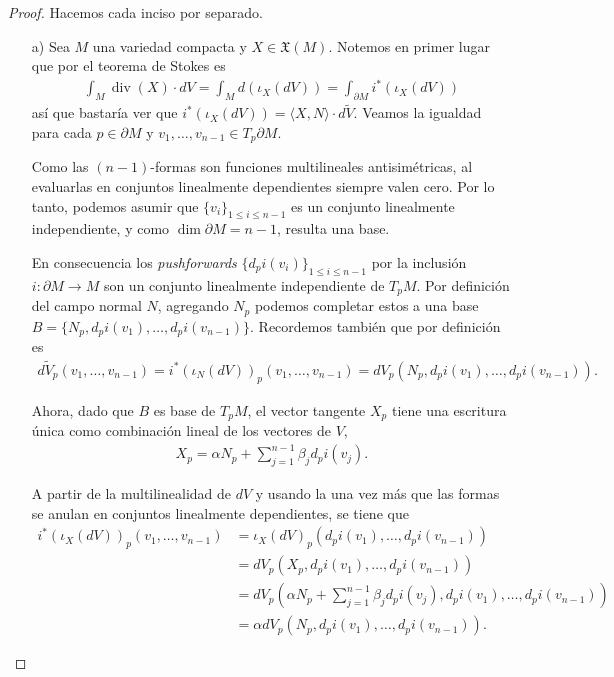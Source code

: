 \documentclass[11pt]{article}
\newcommand{\X}{\mathfrak{X}}
\renewcommand{\div}{\operatorname{div}}
\newcommand{\ip}[1]{\langle #1 \rangle}
\begin{document}
\begin{proof} Hacemos cada inciso por separado.
\begin{itemize}[listparindent = \parindent]
\item[a)] Sea $M$ una variedad compacta y $X \in \X(M)$. Notemos en primer lugar que por el teorema de Stokes es
\begin{align*}
\int_M\div(X) \cdot dV = \int_M d(\iota_X(dV)) = \int_{\partial M} i^*(\iota_X(dV))
\end{align*}
así que bastaría ver que $i^*(\iota_X(dV)) =  \ip{X,N}\cdot d\tilde{V}$. Veamos la igualdad para cada $p \in \partial M$ y $v_1,\dots, v_{n-1} \in T_p \partial M$. 

Como las $(n-1)$-formas son funciones multilineales antisimétricas, al evaluarlas en conjuntos linealmente dependientes siempre valen cero. Por lo tanto, podemos asumir que $\{v_i\}_{1 \leq i \leq n-1}$ es un conjunto linealmente independiente, y como $\dim \partial M = n-1$, resulta una base.

En consecuencia los \textit{pushforwards } $\{d_pi(v_i)\}_{1 \leq i \leq n-1}$ por la inclusión $i : \partial M \to M$ son un conjunto linealmente independiente de $T_pM$. Por definición del campo normal $N$, agregando $N_p$ podemos completar estos a una base $B = \{N_p, d_pi(v_1), \dots, d_pi(v_{n-1})\}$. Recordemos también que por definición es 
\begin{align}
d\tilde{V}_p(v_1, \dots, v_{n-1}) = i^*(\iota_N(dV))_p(v_1, \dots, v_{n-1}) = dV_p(N_p,d_pi(v_1), \dots, d_pi(v_{n-1})).
\end{align}

Ahora, dado que $B$ es base de $T_pM$, el vector tangente $X_p$ tiene una escritura única como combinación lineal de los vectores de $V$,
\begin{align*}
X_p = \alpha N_p + \sum_{j=1}^{n-1}\beta_j d_pi(v_j).
\end{align*}

A partir de la multilinealidad de $dV$ y usando la una vez más que las formas se anulan en conjuntos linealmente dependientes, se tiene que 
\begin{align*}
i^*(\iota_X(dV))_p(v_1, \dots, v_{n-1}) &= \iota_X(dV)_p(d_pi(v_1), \dots, d_pi(v_{n-1}))\\
&= dV_p(X_p,d_pi(v_1), \dots, d_pi(v_{n-1}))\\
&= dV_p\left(\alpha N_p + \sum_{j=1}^{n-1}\beta_j d_pi(v_j),d_pi(v_1), \dots, d_pi(v_{n-1})\right)\\
&= \alpha dV_p\left(N_p,d_pi(v_1), \dots, d_pi(v_{n-1})\right).
\end{align*}


\end{itemize}
\end{proof}
\end{document}
